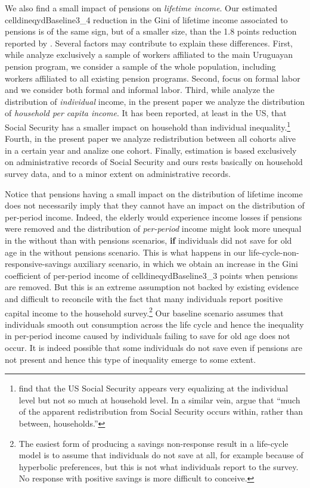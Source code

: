 \documentclass{article}
\newcommand{\celldineqydBaseline}[2]{%
  \csname celldineqydBaseline#1_#2\endcsname
}
\begin{document}
We also find a small impact of pensions on \textit{lifetime income}. Our estimated \celldineqydBaseline{3}{4} reduction in the Gini of lifetime income associated to pensions is of the same sign, but of a smaller size, than the 1.8 points reduction reported by \textcite{Forteza2012}. Several factors may contribute to explain these differences. First, while \citeauthor{Forteza2012} analyze exclusively a sample of workers affiliated to the main Uruguayan pension program, we consider a sample of the whole population, including workers affiliated to all existing pension programs. Second, \citeauthor{Forteza2012} focus on formal labor and we consider both formal and informal labor. Third, while \citeauthor{Forteza2012} analyze the distribution of \textit{individual} income, in the present paper we analyze the distribution of \textit{household per capita income}. It has been reported, at least in the US, that Social Security has a smaller impact on household than individual inequality.\footnote{\textcite{Gustman2001} find that the US Social Security appears very equalizing at the individual level but not so much at household level. In a similar vein, \textcite{Brown2009b} argue that ``much of the apparent redistribution from Social Security occurs within, rather than between, households.''}  Fourth, in the present paper we analyze redistribution between all cohorts alive in a certain year and \citeauthor{Forteza2012} analize one cohort. Finally, \citeauthor{Forteza2012} estimation is based exclusively on administrative records of Social Security and ours rests basically on household survey data, and to a minor extent on administrative records.       

Notice that pensions having a small impact on the distribution of lifetime income does not necessarily imply that they cannot have an impact on the distribution of per-period income. Indeed, the elderly would experience income losses if pensions were removed and the distribution of \textit{per-period} income might look more unequal in the without than with pensions scenarios,  \textbf{if} individuals did not save for old age in the without pensions scenario. This is what happens in our life-cycle-non-responsive-savings auxiliary scenario, in which we obtain an increase in the Gini coefficient of per-period income of \celldineqydBaseline{3}{3} points when pensions are removed. But this is an extreme assumption not backed by existing evidence \parencite{Attanasio2003a, Attanasio2003b, Gale1998} and difficult to reconcile with the fact that many individuals report positive capital income to the household survey.\footnote{The easiest form of producing a savings non-response result in a life-cycle model is to assume that individuals do not save at all, for example because of hyperbolic preferences, but this is not what individuals report to the survey. No response with positive savings is more difficult to conceive.} Our baseline scenario assumes that individuals smooth out consumption across the life cycle and hence the inequality in per-period income caused by individuals failing to save for old age does not occur. It is indeed possible that some individuals do not save even if pensions are not present and hence this type of inequality emerge to some extent. 
\end{document}

